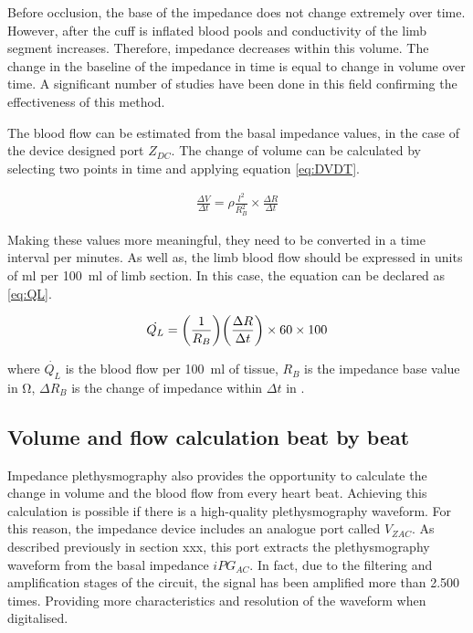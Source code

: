 Before occlusion, the base of the impedance does not change extremely over time. However, after the cuff is inflated blood pools and conductivity of the limb segment increases. Therefore, impedance decreases within this volume. The change in the baseline of the impedance in time is equal to change in volume over time. A significant number of studies have been done in this field confirming the effectiveness of this method. 


The blood flow can be estimated from the basal impedance values, in the case of the device designed port $Z_{DC}$. The change of volume can be calculated by selecting two points in time and applying equation \ref{eq:DVDT}.


\begin{align}
	\label{eq:DVDT}
	\frac{\Delta V}{\Delta t}= \rho \frac{l^2}{R_B^2} \times \frac{\Delta R}{\Delta t}
\end{align} 

Making these values more meaningful, they need to be converted in a time interval per minutes. As well as, the limb blood flow should be expressed in units of \si{\milli\litre} per \SI{100}{\milli\litre} of limb section. In this case, the equation can be declared as \ref{eq:QL}.

\begin{align}
	\label{eq:QL}
	\dot{Q_L} = \bigg( \frac{1}{R_B} \bigg) \bigg( \frac{\Delta R}{\Delta t} \bigg) \times 60  \times 100  \tagaddtext{[\si{ml/min.100.ml}]}
\end{align} 

where $\dot{Q_L}$ is the blood flow per \SI{100}{\milli\litre} of tissue, $R_B$ is the impedance base value in \si{\ohm}, $\Delta R_B$ is the change of impedance within ${\Delta t}$ in \si{\sec}.

\subsection{Volume and flow calculation beat by beat}
\label{section4.3.2}
Impedance plethysmography also provides the opportunity to calculate the change in volume and the blood flow from every heart beat. Achieving this calculation is possible if there is a high-quality plethysmography waveform. For this reason, the impedance device includes an analogue port called $V_{ZAC}$. As described previously in section xxx, this port extracts the plethysmography waveform from the basal impedance $iPG_{AC}$. In fact, due to the filtering and amplification stages of the circuit, the signal has been amplified more than 2.500 times. Providing more characteristics and resolution of the waveform when digitalised.

